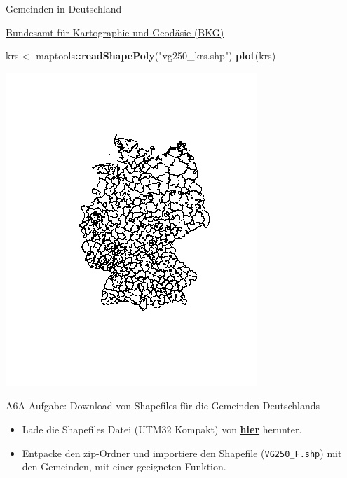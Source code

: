 \documentclass[ignorenonframetext,]{beamer}
\newenvironment{Shaded}{\begin{snugshade}}{\end{snugshade}}
\newcommand{\KeywordTok}[1]{\textcolor[rgb]{0.13,0.29,0.53}{\textbf{#1}}}
\newcommand{\NormalTok}[1]{#1}
\newcommand{\OperatorTok}[1]{\textcolor[rgb]{0.81,0.36,0.00}{\textbf{#1}}}
\newcommand{\StringTok}[1]{\textcolor[rgb]{0.31,0.60,0.02}{#1}}
\providecommand{\tightlist}{%
  \setlength{\itemsep}{0pt}\setlength{\parskip}{0pt}}
\begin{document}
\begin{frame}[fragile]{Gemeinden in Deutschland}
\protect\hypertarget{gemeinden-in-deutschland}{}

\href{http://www.geodatenzentrum.de/geodaten/gdz_rahmen.gdz_div?gdz_spr=deu\&gdz_akt_zeile=5\&gdz_anz_zeile=1\&gdz_unt_zeile=15\&gdz_user_id=0}{Bundesamt
für Kartographie und Geodäsie (BKG)}

\begin{Shaded}
\begin{Highlighting}[]
\NormalTok{krs <-}\StringTok{ }\NormalTok{maptools}\OperatorTok{::}\KeywordTok{readShapePoly}\NormalTok{(}\StringTok{"vg250_krs.shp"}\NormalTok{)}
\KeywordTok{plot}\NormalTok{(krs)}
\end{Highlighting}
\end{Shaded}

\includegraphics{figure/vg250_krs.png}

\end{frame}

\begin{frame}[fragile]{A6A Aufgabe: Download von Shapefiles für die
Gemeinden Deutschlands}
\protect\hypertarget{a6a-aufgabe-download-von-shapefiles-fur-die-gemeinden-deutschlands}{}

\begin{itemize}
\tightlist
\item
  Lade die Shapefiles Datei (UTM32 Kompakt) von
  \href{http://www.geodatenzentrum.de/geodaten/gdz_rahmen.gdz_div?gdz_spr=deu\&gdz_akt_zeile=5\&gdz_anz_zeile=1\&gdz_unt_zeile=15\&gdz_user_id=0}{\textbf{hier}}
  herunter.
\item
  Entpacke den zip-Ordner und importiere den Shapefile
  (\texttt{VG250\_F.shp}) mit den Gemeinden, mit einer geeigneten
  Funktion.
\end{itemize}

\end{frame}
\end{document}

